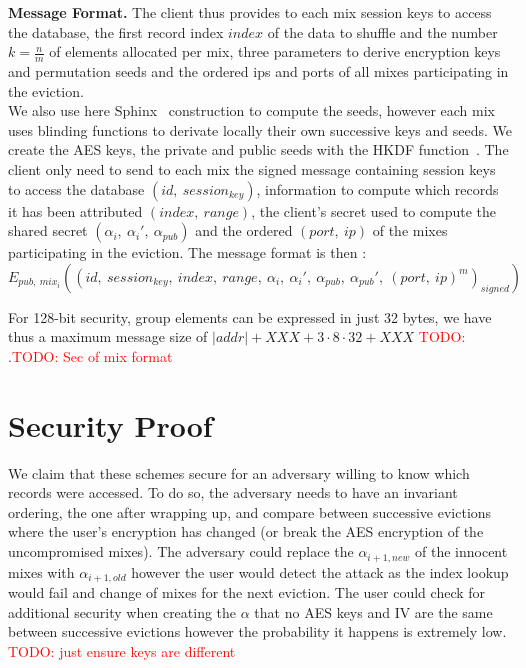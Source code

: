 \documentclass{llncs}
\newcommand{\todo}[1]{\textcolor{red}{TODO: #1}}
\begin{document}
\noindent\textbf{Message Format.}
The client thus provides to each mix session keys to access the database, the first record index $index$ of the data to shuffle and the number $k=\frac{n}{m}$ of elements allocated per mix, three parameters to derive encryption keys and permutation seeds and the ordered ips and ports of all mixes participating in the eviction.\\
We also use here Sphinx~\cite{danezis2009sphinx} construction to compute the seeds, however each mix uses blinding functions to derivate locally their own successive keys and seeds. \iffalse\\
Let $\kappa$ be the security parameter. We call $\mathcal{G}$ a prime order cyclic group satisfying the Decisional Diffie-Hellman Assumption. $\mathcal{G}^*$ is the set of non-identity elements of $\mathcal{G}$. The element $g$ is a generator of the group, and $q$ is the prime order of $\mathcal{G}$ with $q \approx 2^{2\kappa}$.\\
We suppose each mix owns a pair of keys ($\ priv_i \in \mathbb{Z}_{q}^*$, $pub_i=g^{priv_i}\in \mathcal{G}^*$). We assume the existence of a PKI that publishes a list of all ($mix_i$,\ $pub_i$) pair.
The client randomly chooses $x\in_\mathcal{R} \mathbb{Z}_q^*$ and sends to the mix $mix_i$ the element $\alpha_i=g^{x\cdot b_i}$ with $b_i$ a binding factors, the shared secret is then $s_i=pub_i^{x\cdot b_i}$.
\fi
We create the AES keys, the private and public seeds with the HKDF function~\cite{krawczyk2010cryptographic}. The client only need to send to each mix the signed message containing session keys to access the database $(id,\ session_{key})$, information to compute which records it has been attributed $(index,\ range)$, the client's secret used to compute the shared secret $(\alpha_i,\ \alpha_i',\ \alpha_{pub})$ and the ordered $(port,\ ip)$ of the mixes participating in the eviction.
The message format is then : $$E_{pub,\ mix_i}\left (\left(id,\ session_{key},\ index,\ range,\ \alpha_i,\ \alpha_i',\ \alpha_{pub},\ \alpha_{pub}',\ (port,\ ip)^m \right )_{signed}\right )$$

For 128-bit security, group elements can be expressed in just 32 bytes, we have thus a maximum message size of $|addr|+XXX + 3 \cdot 8 \cdot 32 + XXX$ \todo{}.\todo{Sec of mix format}

\section{Security Proof}\label{Security}
We claim that these schemes secure for an adversary willing to know which records were accessed. To do so, the adversary needs to have an invariant ordering, the one after wrapping up, and compare between successive evictions where the user's encryption has changed (or break the AES encryption of the uncompromised mixes). 
The adversary could replace the $\alpha_{i+1,new}$ of the innocent mixes with $\alpha_{i+1, old}$ however the user would detect the attack as the index lookup would fail and change of mixes for the next eviction.
The user could check for additional security when creating the $\alpha$ that no AES keys and IV are the same between successive evictions however the probability it happens is extremely low. \todo{just ensure keys are different}
\end{document}
